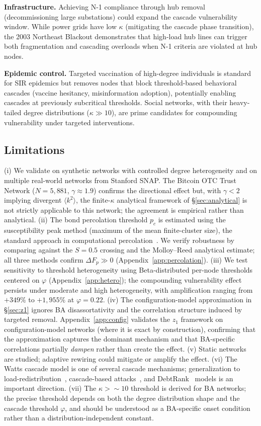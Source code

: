 \documentclass[aps,pre,twocolumn,superscriptaddress,showpacs]{revtex4-2}
\newcommand{\avg}[1]{\langle #1 \rangle}
\newcommand{\pc}{p_c}
\newcommand{\DF}{\Delta F}
\begin{document}
\textbf{Infrastructure.} Achieving N-1 compliance through hub removal (decommissioning large substations) could expand the cascade vulnerability window. While power grids have low $\kappa$ (mitigating the cascade phase transition), the 2003 Northeast Blackout demonstrates that high-load hub lines can trigger both fragmentation and cascading overloads when N-1 criteria are violated at hub nodes.

\textbf{Epidemic control.} Targeted vaccination of high-degree individuals is standard for SIR epidemics but removes nodes that block threshold-based behavioral cascades (vaccine hesitancy, misinformation adoption), potentially enabling cascades at previously subcritical thresholds. Social networks, with their heavy-tailed degree distributions ($\kappa \gg 10$), are prime candidates for compounding vulnerability under targeted interventions.

\subsection{Limitations}
\label{sec:limitations}

(i) We validate on synthetic networks with controlled degree heterogeneity and on multiple real-world networks from Stanford SNAP. The Bitcoin OTC Trust Network ($N=5{,}881$, $\gamma \approx 1.9$) confirms the directional effect but, with $\gamma < 2$ implying divergent $\avg{k^2}$, the finite-$\kappa$ analytical framework of \S\ref{sec:analytical} is not strictly applicable to this network; the agreement is empirical rather than analytical. (ii) The bond percolation threshold $\pc$ is estimated using the susceptibility peak method (maximum of the mean finite-cluster size), the standard approach in computational percolation~\cite{Newman2001}. We verify robustness by comparing against the $S=0.5$ crossing and the Molloy--Reed analytical estimate; all three methods confirm $\DF_p \gg 0$ (Appendix~\ref{app:percolation}). (iii) We test sensitivity to threshold heterogeneity using Beta-distributed per-node thresholds centered on $\varphi$ (Appendix~\ref{app:hetero}); the compounding vulnerability effect persists under moderate and high heterogeneity, with amplification ranging from $+349\%$ to $+1{,}955\%$ at $\varphi=0.22$. (iv) The configuration-model approximation in \S\ref{sec:z1} ignores BA disassortativity and the correlation structure induced by targeted removal. Appendix~\ref{app:config} validates the $z_1$ framework on configuration-model networks (where it is exact by construction), confirming that the approximation captures the dominant mechanism and that BA-specific correlations partially \emph{dampen} rather than create the effect. (v) Static networks are studied; adaptive rewiring could mitigate or amplify the effect. (vi) The Watts cascade model is one of several cascade mechanisms; generalization to load-redistribution~\cite{Motter2004}, cascade-based attacks~\cite{Motter2002}, and DebtRank~\cite{Battiston2012} models is an important direction. (vii) The $\kappa > {\sim}10$ threshold is derived for BA networks; the precise threshold depends on both the degree distribution shape and the cascade threshold $\varphi$, and should be understood as a BA-specific onset condition rather than a distribution-independent constant.
\end{document}
